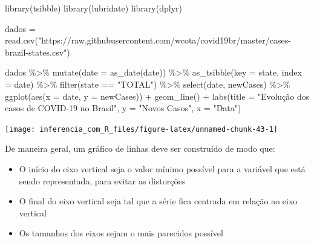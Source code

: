 \documentclass[
]{book}
\newenvironment{Shaded}{\begin{snugshade}}{\end{snugshade}}
\newcommand{\AttributeTok}[1]{\textcolor[rgb]{0.77,0.63,0.00}{#1}}
\newcommand{\FunctionTok}[1]{\textcolor[rgb]{0.00,0.00,0.00}{#1}}
\newcommand{\NormalTok}[1]{#1}
\newcommand{\OtherTok}[1]{\textcolor[rgb]{0.56,0.35,0.01}{#1}}
\newcommand{\SpecialCharTok}[1]{\textcolor[rgb]{0.00,0.00,0.00}{#1}}
\newcommand{\StringTok}[1]{\textcolor[rgb]{0.31,0.60,0.02}{#1}}
\providecommand{\tightlist}{%
  \setlength{\itemsep}{0pt}\setlength{\parskip}{0pt}}
\begin{document}
\begin{Shaded}
\begin{Highlighting}[]
\FunctionTok{library}\NormalTok{(tsibble)}
\FunctionTok{library}\NormalTok{(lubridate)}
\FunctionTok{library}\NormalTok{(dplyr)}

\NormalTok{dados }\OtherTok{=} \FunctionTok{read.csv}\NormalTok{(}\StringTok{"https://raw.githubusercontent.com/wcota/covid19br/master/cases{-}brazil{-}states.csv"}\NormalTok{)}

\NormalTok{dados }\SpecialCharTok{\%\textgreater{}\%}
  \FunctionTok{mutate}\NormalTok{(}\AttributeTok{date =} \FunctionTok{as\_date}\NormalTok{(date)) }\SpecialCharTok{\%\textgreater{}\%} 
  \FunctionTok{as\_tsibble}\NormalTok{(}\AttributeTok{key =}\NormalTok{ state, }\AttributeTok{index =}\NormalTok{ date) }\SpecialCharTok{\%\textgreater{}\%} 
  \FunctionTok{filter}\NormalTok{(state }\SpecialCharTok{==} \StringTok{"TOTAL"}\NormalTok{) }\SpecialCharTok{\%\textgreater{}\%} 
  \FunctionTok{select}\NormalTok{(date, newCases) }\SpecialCharTok{\%\textgreater{}\%}
  \FunctionTok{ggplot}\NormalTok{(}\FunctionTok{aes}\NormalTok{(}\AttributeTok{x =}\NormalTok{ date, }\AttributeTok{y =}\NormalTok{ newCases)) }\SpecialCharTok{+}
  \FunctionTok{geom\_line}\NormalTok{() }\SpecialCharTok{+}
  \FunctionTok{labs}\NormalTok{(}\AttributeTok{title =} \StringTok{"Evolução dos casos de COVID{-}19 no Brasil"}\NormalTok{,}
       \AttributeTok{y =} \StringTok{"Novos Casos"}\NormalTok{, }\AttributeTok{x =} \StringTok{"Data"}\NormalTok{)}
\end{Highlighting}
\end{Shaded}

\begin{center}\texttt{[image: inferencia\_com\_R\_files/figure-latex/unnamed-chunk-43-1]} \end{center}

De maneira geral, um gráfico de linhas deve ser construído de modo que:

\begin{itemize}
\tightlist
\item
  O início do eixo vertical seja o valor mínimo possível para a variável que está sendo representada, para evitar as distorções
\item
  O final do eixo vertical seja tal que a série fica centrada em relação ao eixo vertical
\item
  Os tamanhos dos eixos sejam o mais parecidos possível
\end{itemize}
\end{document}
